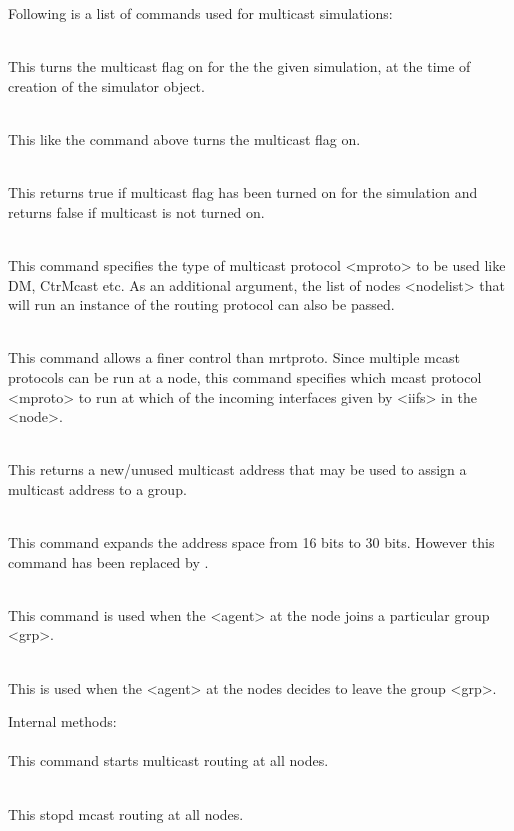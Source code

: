 Following is a list of commands used for multicast simulations:
\begin{flushleft}
\\
This turns the multicast flag on for the the given simulation, at the time of
creation of the simulator object.


\\
This like the command above turns the multicast flag on.


\\
This returns true if multicast flag has been turned on for the simulation
and returns false if multicast is not turned on.


\\
This command specifies the type of multicast protocol <mproto> to be used
like DM, CtrMcast etc. As an additional argument, the list of nodes <nodelist>
that will run an instance of the routing protocol can also be passed.


\\
This command allows a finer control than mrtproto. Since multiple mcast
protocols can be run at a node, this command specifies which mcast protocol
<mproto> to run at which of the incoming interfaces given by <iifs> in the <node>.


\\
This returns a new/unused multicast address that may be used to assign a multicast
address to a group.


\\
This command expands the address space from 16 bits to 30 bits. However this
command has been replaced by .


\\
This command is used when the <agent> at the node joins a particular group <grp>.


\\
This is used when the <agent> at the nodes decides to leave the group <grp>.

Internal methods:\\

\\
This command starts multicast routing at all nodes. 


\\
This stopd mcast routing at all nodes.



\end{flushleft}
